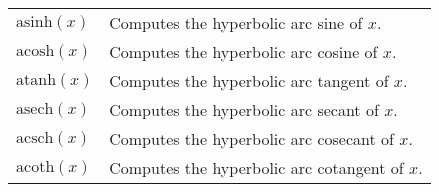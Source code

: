 \documentclass[10pt]{article}
\begin{document}
\begin{longtable}{p{}p{}}
        $ \mathrm{asinh}(x) $                      & Computes the hyperbolic arc sine of $ x $. \\
        $ \mathrm{acosh}(x) $                      & Computes the hyperbolic arc cosine of $ x $. \\
        $ \mathrm{atanh}(x) $                      & Computes the hyperbolic arc tangent of $ x $. \\
        $ \mathrm{asech}(x) $                      & Computes the hyperbolic arc secant of $ x $. \\
        $ \mathrm{acsch}(x) $                      & Computes the hyperbolic arc cosecant of $ x $. \\
        $ \mathrm{acoth}(x) $                      & Computes the hyperbolic arc cotangent of $ x $. \\
    \end{longtable}
    
\end{document}
